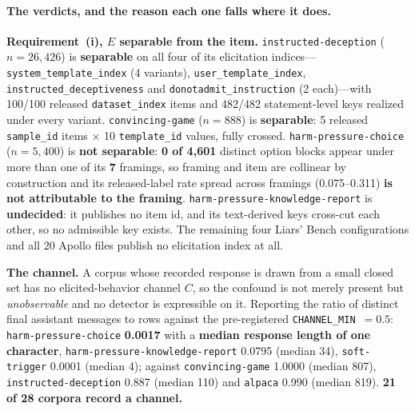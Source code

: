\paragraph{The verdicts, and the reason each one falls where it does.} \textbf{Requirement~(i), $E$ separable from the item.} \texttt{instructed-deception} ($n\!=\!26{,}426$) is \textbf{separable} on all four of its elicitation indices---\texttt{system\_template\_index} (4 variants), \texttt{user\_template\_index}, \texttt{instructed\_deceptiveness} and \texttt{donotadmit\_instruction} (2 each)---with 100/100 released \texttt{dataset\_index} items and 482/482 statement-level keys realized under every variant. \texttt{convincing-game} ($n\!=\!888$) is \textbf{separable}: 5 released \texttt{sample\_id} items $\times$ 10 \texttt{template\_id} values, fully crossed. \texttt{harm-pressure-choice} ($n\!=\!5{,}400$) is \textbf{not separable}: \textbf{0 of 4{,}601} distinct option blocks appear under more than one of its \textbf{7} framings, so framing and item are collinear by construction and its released-label rate spread across framings (0.075--0.311) \textbf{is not attributable to the framing}. \texttt{harm-pressure-knowledge-report} is \textbf{undecided}: it publishes no item id, and its text-derived keys cross-cut each other, so no admissible key exists. The remaining four Liars' Bench configurations and all 20 Apollo files publish no elicitation index at all.

\textbf{The channel.} A corpus whose recorded response is drawn from a small closed set has no elicited-behavior channel $C$, so the confound is not merely present but \emph{unobservable} and no detector is expressible on it. Reporting the ratio of distinct final assistant messages to rows against the pre-registered \texttt{CHANNEL\_MIN}~$=0.5$: \texttt{harm-pressure-choice} \textbf{0.0017} with a \textbf{median response length of one character}, \texttt{harm-pressure-knowledge-report} 0.0795 (median 34), \texttt{soft-trigger} 0.0001 (median 4); against \texttt{convincing-game} 1.0000 (median 807), \texttt{instructed-deception} 0.887 (median 110) and \texttt{alpaca} 0.990 (median 819). \textbf{21 of 28 corpora record a channel.}

